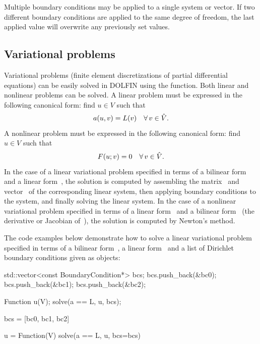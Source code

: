 Multiple boundary conditions may be applied to a single system or
vector. If two different boundary conditions are applied to the same
degree of freedom, the last applied value will overwrite any
previously set values.

\subsection{Variational problems}

Variational problems (finite element discretizations of partial
differential equations) can be easily solved in DOLFIN using the
 function. Both linear and nonlinear problems can be
solved. A linear problem must be expressed in the following canonical
form: find $u \in V$ such that
\begin{equation}
  a(u, v) = L(v) \quad \forall\, v \in \hat{V}.
\end{equation}
A nonlinear problem must be expressed in the following canonical form:
find $u \in V$ such that
\begin{equation}
  F(u; v) = 0 \quad \forall\, v \in \hat{V}.
\end{equation}
In the case of a linear variational problem specified in terms of a
bilinear form~ and a linear form~, the solution is
computed by assembling the matrix~ and vector~ of the
corresponding linear system, then applying boundary conditions to the
system, and finally solving the linear system. In the case of a
nonlinear variational problem specified in terms of a linear
form~ and a bilinear form~ (the derivative or Jacobian
of~), the solution is computed by Newton's method.

The code examples below demonstrate how to solve a linear variational
problem specified in terms of a bilinear form~, a linear
form~ and a list of Dirichlet boundary conditions given as
 objects:
\begin{c++}
std::vector<const BoundaryCondition*> bcs;
bcs.push_back(&bc0);
bcs.push_back(&bc1);
bcs.push_back(&bc2);

Function u(V);
solve(a == L, u, bcs);
\end{c++}
\begin{python}
bcs = [bc0, bc1, bc2]

u = Function(V)
solve(a == L, u, bcs=bcs)
\end{python}

